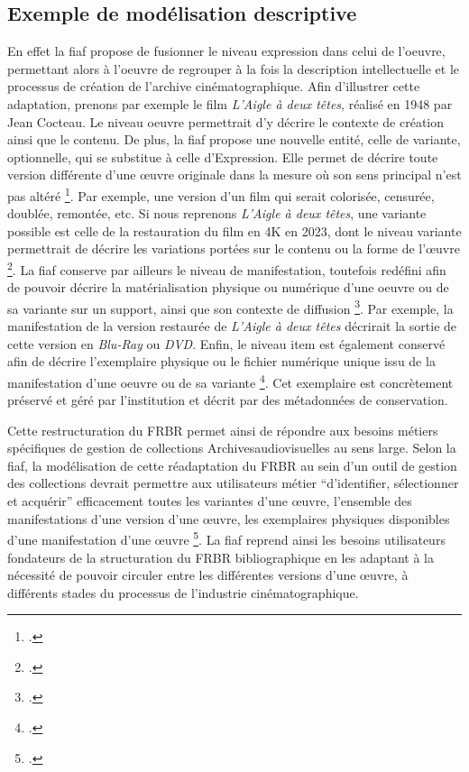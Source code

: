 \subsection{Exemple de modélisation descriptive}
En effet la \gls{fiaf} propose de fusionner le niveau \gls{expression} dans celui de l'\gls{oeuvre}, permettant alors à l’\gls{oeuvre} de regrouper à la fois la description intellectuelle et le processus de création de l’archive cinématographique. Afin d'illustrer cette adaptation, prenons par exemple le film \textit{L'Aigle à deux têtes}, réalisé en 1948 par Jean Cocteau. Le niveau \gls{oeuvre} permettrait d’y décrire le contexte de création ainsi que le contenu. De plus, la \gls{fiaf} propose une nouvelle entité, celle de \gls{variante}, optionnelle, qui se substitue à celle d’Expression. Elle permet de décrire toute version différente d’une œuvre originale dans la mesure où son sens principal n’est pas altéré \footcite{zotero-item-646}. Par exemple, une version d’un film qui serait colorisée, censurée, doublée, remontée, etc. Si nous reprenons \textit{L'Aigle à deux têtes}, une \gls{variante} possible est celle de la restauration du film en 4K en 2023, dont le niveau \gls{variante} permettrait de décrire les variations portées sur le contenu ou la forme de l’œuvre \footcite{zotero-item-818}. La \gls{fiaf} conserve par ailleurs le niveau de \gls{manifestation}, toutefois redéfini afin de pouvoir décrire la matérialisation physique ou numérique d’une \gls{oeuvre} ou de sa \gls{variante} sur un support, ainsi que son contexte de diffusion \footcite{zotero-item-646}. Par exemple, la manifestation de la version restaurée de \textit{L'Aigle à deux têtes} décrirait la sortie de cette version en \textit{Blu-Ray} ou \textit{DVD}. Enfin, le niveau \gls{item} est également conservé afin de décrire l’exemplaire physique ou le fichier numérique unique issu de la \gls{manifestation} d’une \gls{oeuvre} ou de sa \gls{variante} \footcite{zotero-item-646}. Cet exemplaire est concrètement préservé et géré par l’institution et décrit par des métadonnées de conservation.  


Cette restructuration du \gls{FRBR} permet ainsi de répondre aux besoins métiers spécifiques de gestion de collections \gls{Archivesaudiovisuelles} au sens large. Selon la \gls{fiaf}, la modélisation de cette réadaptation du \gls{FRBR} au sein d’un outil de gestion des collections devrait permettre aux utilisateurs métier “d’identifier, sélectionner et acquérir” efficacement toutes les variantes d’une œuvre, l’ensemble des manifestations d’une version d’une œuvre, les exemplaires physiques disponibles d’une manifestation d’une œuvre \footcite{zotero-item-646}. La \gls{fiaf} reprend ainsi les besoins utilisateurs fondateurs de la structuration du \gls{FRBR} bibliographique en les adaptant à la nécessité de pouvoir circuler entre les différentes versions d’une œuvre, à différents stades du processus de l’industrie cinématographique.  

